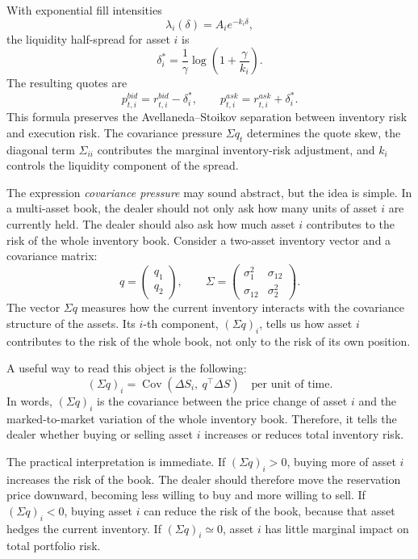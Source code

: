 With exponential fill intensities
\[
\lambda_i(\delta)=A_i e^{-k_i\delta},
\]
the liquidity half-spread for asset $i$ is
\[
\delta_i^*
=
\frac{1}{\gamma}
\log\!\left(1+\frac{\gamma}{k_i}\right).
\]
The resulting quotes are
\[
p_{t,i}^{bid}
=
r_{t,i}^{bid}-\delta_i^*,
\qquad
p_{t,i}^{ask}
=
r_{t,i}^{ask}+\delta_i^*.
\]
This formula preserves the Avellaneda--Stoikov separation between inventory risk and execution risk. The covariance pressure $\Sigma q_t$ determines the quote skew, the diagonal term $\Sigma_{ii}$ contributes the marginal inventory-risk adjustment, and $k_i$ controls the liquidity component of the spread.

The expression \emph{covariance pressure} may sound abstract, but the idea is simple. In a multi-asset book, the dealer should not only ask how many units of asset $i$ are currently held. The dealer should also ask how much asset $i$ contributes to the risk of the whole inventory book. Consider a two-asset inventory vector and a covariance matrix:
\[
q=
\begin{pmatrix}
q_1\\
q_2
\end{pmatrix},
\qquad
\Sigma=
\begin{pmatrix}
\sigma_1^2 & \sigma_{12}\\
\sigma_{12} & \sigma_2^2
\end{pmatrix}.
\]
The vector $\Sigma q$ measures how the current inventory interacts with the covariance structure of the assets. Its $i$-th component, $(\Sigma q)_i$, tells us how asset $i$ contributes to the risk of the whole book, not only to the risk of its own position.

A useful way to read this object is the following:
\[
(\Sigma q)_i
=
\operatorname{Cov}\!\left(\Delta S_i,\ q^\top \Delta S\right)
\quad
\text{per unit of time}.
\]
In words, $(\Sigma q)_i$ is the covariance between the price change of asset $i$ and the marked-to-market variation of the whole inventory book. Therefore, it tells the dealer whether buying or selling asset $i$ increases or reduces total inventory risk.

The practical interpretation is immediate. If $(\Sigma q)_i>0$, buying more of asset $i$ increases the risk of the book. The dealer should therefore move the reservation price downward, becoming less willing to buy and more willing to sell. If $(\Sigma q)_i<0$, buying asset $i$ can reduce the risk of the book, because that asset hedges the current inventory. If $(\Sigma q)_i\simeq 0$, asset $i$ has little marginal impact on total portfolio risk.

